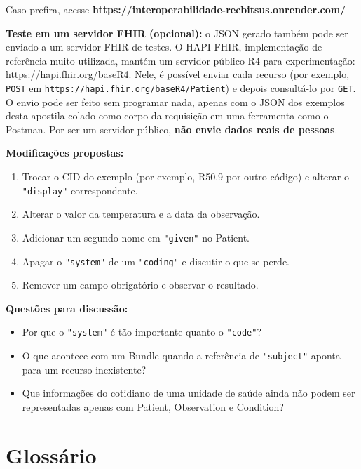 \documentclass[11pt,a4paper]{article}
\newcommand{\codigo}[1]{\texttt{#1}}
\begin{document}
Caso prefira, acesse \textbf{https://interoperabilidade-recbitsus.onrender.com/}

\textbf{Teste em um servidor FHIR (opcional):} o JSON gerado também pode
ser enviado a um servidor FHIR de testes. O HAPI FHIR, implementação
de referência muito utilizada, mantém um servidor público R4 para
experimentação: \url{https://hapi.fhir.org/baseR4}. Nele, é possível
enviar cada recurso (por exemplo, \codigo{POST} em
\codigo{https://hapi.fhir.org/baseR4/Patient}) e depois consultá-lo por
\codigo{GET}. O envio pode ser feito sem programar nada, apenas com o JSON
dos exemplos desta apostila colado como corpo da requisição em uma
ferramenta como o Postman. Por ser um servidor público, \textbf{não envie
dados reais de pessoas}.

\textbf{Modificações propostas:}

\begin{enumerate}[label=\alph*)]
  \item Trocar o CID do exemplo (por exemplo, R50.9 por outro código) e
    alterar o \codigo{"display"} correspondente.
  \item Alterar o valor da temperatura e a data da observação.
  \item Adicionar um segundo nome em \codigo{"given"} no Patient.
  \item Apagar o \codigo{"system"} de um \codigo{"coding"} e discutir o
    que se perde.
  \item Remover um campo obrigatório e observar o resultado.
\end{enumerate}

\textbf{Questões para discussão:}

\begin{itemize}
  \item Por que o \codigo{"system"} é tão importante quanto o
    \codigo{"code"}?
  \item O que acontece com um Bundle quando a referência de
    \codigo{"subject"} aponta para um recurso inexistente?
  \item Que informações do cotidiano de uma unidade de saúde ainda não
    podem ser representadas apenas com Patient, Observation e Condition?
\end{itemize}

\section*{Glossário}
\end{document}

